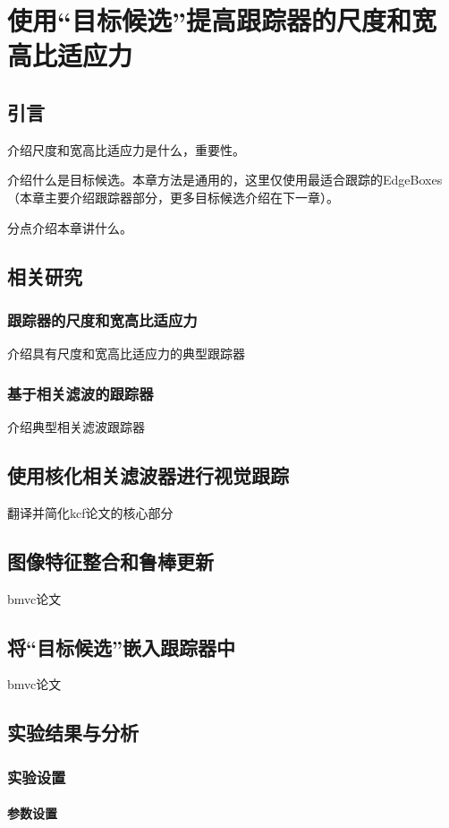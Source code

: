\chapter{使用``目标候选''提高跟踪器的尺度和宽高比适应力}

\section{引言}
介绍尺度和宽高比适应力是什么，重要性。

介绍什么是目标候选。本章方法是通用的，这里仅使用最适合跟踪的EdgeBoxes（本章主要介绍跟踪器部分，更多目标候选介绍在下一章）。

分点介绍本章讲什么。

\section{相关研究}
\subsection{跟踪器的尺度和宽高比适应力}
介绍具有尺度和宽高比适应力的典型跟踪器
\subsection{基于相关滤波的跟踪器}
介绍典型相关滤波跟踪器

\section{使用核化相关滤波器进行视觉跟踪}
翻译并简化kcf论文的核心部分

\section{图像特征整合和鲁棒更新}
bmvc论文

\section{将``目标候选''嵌入跟踪器中}
bmvc论文

\section{实验结果与分析}
\subsection{实验设置}
\subsubsection{参数设置}
